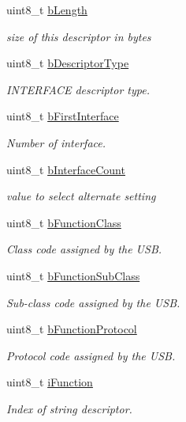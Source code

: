 \begin{DoxyCompactItemize}
\item 
uint8\-\_\-t \hyperlink{structusb__association__desc__t_a774827521c274300369abe56757a12be}{b\-Length}
\begin{DoxyCompactList}\small\item\em size of this descriptor in bytes \end{DoxyCompactList}\item 
uint8\-\_\-t \hyperlink{structusb__association__desc__t_a5ffca50476ae4206a7ce2e4e896f5efe}{b\-Descriptor\-Type}
\begin{DoxyCompactList}\small\item\em \-I\-N\-T\-E\-R\-F\-A\-C\-E descriptor type. \end{DoxyCompactList}\item 
uint8\-\_\-t \hyperlink{structusb__association__desc__t_ac40074d8093e2be0f98b7513fb3e42f8}{b\-First\-Interface}
\begin{DoxyCompactList}\small\item\em \-Number of interface. \end{DoxyCompactList}\item 
uint8\-\_\-t \hyperlink{structusb__association__desc__t_a3fa0288c02ae9c72411f564ecf427c5b}{b\-Interface\-Count}
\begin{DoxyCompactList}\small\item\em value to select alternate setting \end{DoxyCompactList}\item 
uint8\-\_\-t \hyperlink{structusb__association__desc__t_af2f295c5ccf362d8db46b712549e467a}{b\-Function\-Class}
\begin{DoxyCompactList}\small\item\em \-Class code assigned by the \-U\-S\-B. \end{DoxyCompactList}\item 
uint8\-\_\-t \hyperlink{structusb__association__desc__t_a4ab4cadd0f156f30edea9d4724501a06}{b\-Function\-Sub\-Class}
\begin{DoxyCompactList}\small\item\em \-Sub-\/class code assigned by the \-U\-S\-B. \end{DoxyCompactList}\item 
uint8\-\_\-t \hyperlink{structusb__association__desc__t_a7e136eb3457b18de956967735b236783}{b\-Function\-Protocol}
\begin{DoxyCompactList}\small\item\em \-Protocol code assigned by the \-U\-S\-B. \end{DoxyCompactList}\item 
uint8\-\_\-t \hyperlink{structusb__association__desc__t_aeedbc36cd31e652127b78004b0c66031}{i\-Function}
\begin{DoxyCompactList}\small\item\em \-Index of string descriptor. \end{DoxyCompactList}\end{DoxyCompactItemize}


